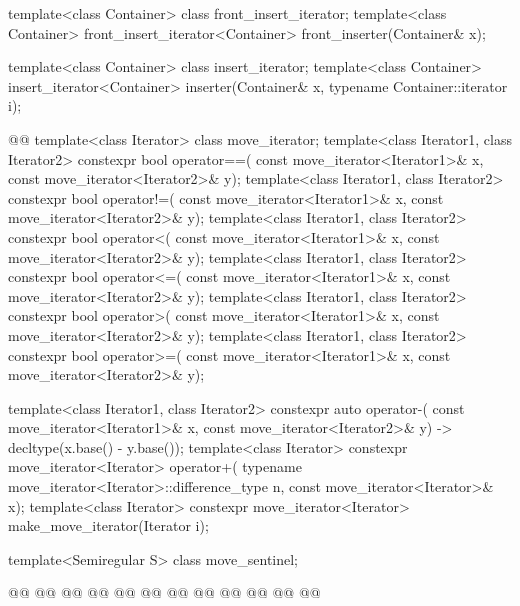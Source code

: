 \begin{codeblock}
  template<class Container> class front_insert_iterator;
  template<class Container>
    front_insert_iterator<Container> front_inserter(Container& x);

  template<class Container> class insert_iterator;
  template<class Container>
    insert_iterator<Container> inserter(Container& x, typename Container::iterator i);

  @@
  template<class Iterator> class move_iterator;
  template<class Iterator1, class Iterator2>
    constexpr bool operator==(
      const move_iterator<Iterator1>& x, const move_iterator<Iterator2>& y);
  template<class Iterator1, class Iterator2>
    constexpr bool operator!=(
      const move_iterator<Iterator1>& x, const move_iterator<Iterator2>& y);
  template<class Iterator1, class Iterator2>
    constexpr bool operator<(
      const move_iterator<Iterator1>& x, const move_iterator<Iterator2>& y);
  template<class Iterator1, class Iterator2>
    constexpr bool operator<=(
      const move_iterator<Iterator1>& x, const move_iterator<Iterator2>& y);
  template<class Iterator1, class Iterator2>
    constexpr bool operator>(
      const move_iterator<Iterator1>& x, const move_iterator<Iterator2>& y);
  template<class Iterator1, class Iterator2>
    constexpr bool operator>=(
      const move_iterator<Iterator1>& x, const move_iterator<Iterator2>& y);

  template<class Iterator1, class Iterator2>
    constexpr auto operator-(
    const move_iterator<Iterator1>& x,
    const move_iterator<Iterator2>& y) -> decltype(x.base() - y.base());
  template<class Iterator>
    constexpr move_iterator<Iterator> operator+(
      typename move_iterator<Iterator>::difference_type n, const move_iterator<Iterator>& x);
  template<class Iterator>
    constexpr move_iterator<Iterator> make_move_iterator(Iterator i);

\end{codeblock}\begin{addedblock}\begin{codeblock}
  template<Semiregular S> class move_sentinel;

  @@
    @@
      @@
  @@
    @@
      @@
  @@
    @@
      @@
  @@
    @@
      @@


\end{codeblock}
\end{addedblock}

